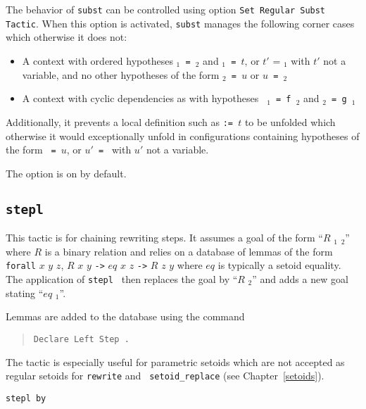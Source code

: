 \begin{coq_example*}
\begin{Variants}
 The behavior of {\tt subst} can be controlled using option {\tt Set
    Regular Subst Tactic}. When this option is activated, {\tt subst}
  manages the following corner cases which otherwise it
  does not:
\begin{itemize}
\item A context with ordered hypotheses {\tt \ident$_1$ = \ident$_2$}
  and {\tt \ident$_1$ = $t$}, or {$t'$ = \ident$_1$} with $t'$ not a
  variable, and no other hypotheses of the form {\tt \ident$_2$ = $u$}
  or {\tt $u$ = \ident$_2$}
\item A context with cyclic dependencies as with hypotheses {\tt
  \ident$_1$ = f~\ident$_2$} and {\tt \ident$_2$ = g~\ident$_1$}
\end{itemize}
Additionally, it prevents a local definition such as {\tt \ident :=
  $t$} to be unfolded which otherwise it would exceptionally unfold in
configurations containing hypotheses of the form {\tt {\ident} = $u$},
or {\tt $u'$ = \ident} with $u'$ not a variable.

The option is on by default.

\end{Variants}

\subsection{\tt stepl \term}

This tactic is for chaining rewriting steps. It assumes a goal of the
form ``$R$ {\term}$_1$ {\term}$_2$'' where $R$ is a binary relation
and relies on a database of lemmas of the form {\tt forall} $x$ $y$
$z$, $R$ $x$ $y$ {\tt ->} $eq$ $x$ $z$ {\tt ->} $R$ $z$ $y$ where $eq$
is typically a setoid equality. The application of {\tt stepl {\term}}
then replaces the goal by ``$R$ {\term} {\term}$_2$'' and adds a new
goal stating ``$eq$ {\term} {\term}$_1$''.

Lemmas are added to the database using the command
\begin{quote}
{\tt Declare Left Step {\term}.}
\end{quote}

The tactic is especially useful for parametric setoids which are not
accepted as regular setoids for {\tt rewrite} and {\tt
  setoid\_replace} (see Chapter~\ref{setoids}).

\begin{Variants}
\item{\tt stepl {\term} by {\tac}}


\end{Variants}
\end{coq_example*}
